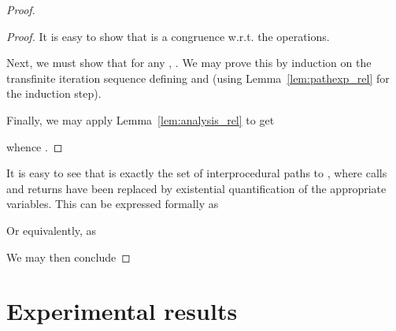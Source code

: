 \begin{proof}
\begin{proof}
       It is easy to show that  is a congruence w.r.t. the \QPKA{}
       operations.

       Next, we must show that for any ,
       .
       We may prove this by induction on the transfinite iteration
       sequence defining  and
        (using Lemma~\ref{lem:pathexp_rel} for the
       induction step).

       Finally, we may apply Lemma~\ref{lem:analysis_rel} to get
       
       whence .
     \end{proof}

     It is easy to see that  is exactly the set of
     interprocedural paths to , where calls and returns have been replaced
     by existential quantification of the appropriate variables.  This can be
     expressed formally as
     
     Or equivalently, as
     

     We may then conclude
     
   \end{proof}











\section{Experimental results}

